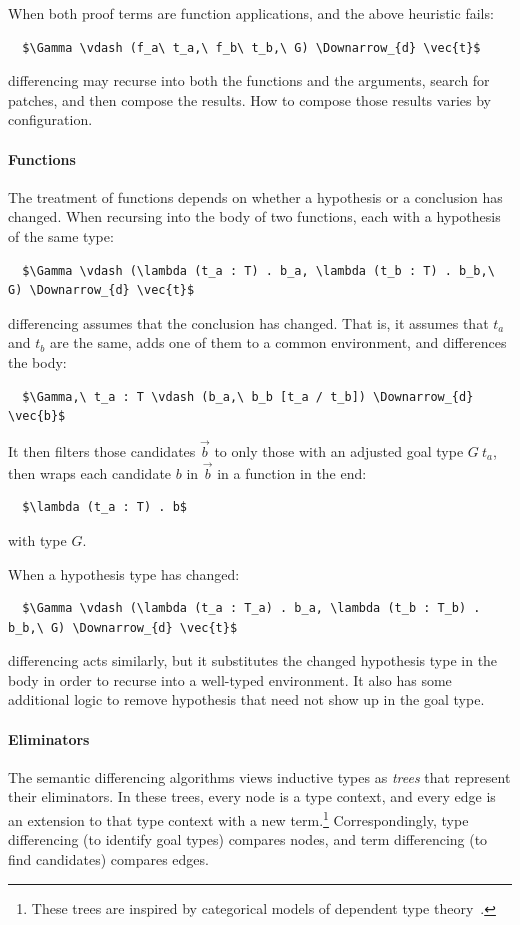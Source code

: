 When both proof terms are function applications, and the above heuristic fails:

\begin{lstlisting}
  $\Gamma \vdash (f_a\ t_a,\ f_b\ t_b,\ G) \Downarrow_{d} \vec{t}$
\end{lstlisting}
differencing may recurse into both the functions and the arguments, search for patches, and then compose the results.
How to compose those results varies by configuration.

\paragraph{Functions} %
The treatment of functions depends on whether a hypothesis or a conclusion has changed.
When recursing into the body of two functions, each with a hypothesis of the same type:

\begin{lstlisting}
  $\Gamma \vdash (\lambda (t_a : T) . b_a, \lambda (t_b : T) . b_b,\ G) \Downarrow_{d} \vec{t}$
\end{lstlisting}
differencing assumes that the conclusion has changed.
That is, it assumes that $t_a$ and $t_b$ are the same, adds one of them to a common environment,
and differences the body:

\begin{lstlisting}
  $\Gamma,\ t_a : T \vdash (b_a,\ b_b [t_a / t_b]) \Downarrow_{d} \vec{b}$
\end{lstlisting}
It then filters those candidates $\vec{b}$ to only those with an adjusted goal type $G\ t_a$,
then wraps each candidate $b$ in $\vec{b}$ in a function in the end:

\begin{lstlisting}
  $\lambda (t_a : T) . b$
\end{lstlisting}
with type $G$.

When a hypothesis type has changed:

\begin{lstlisting}
  $\Gamma \vdash (\lambda (t_a : T_a) . b_a, \lambda (t_b : T_b) . b_b,\ G) \Downarrow_{d} \vec{t}$
\end{lstlisting}
differencing acts similarly, but it substitutes the changed hypothesis type in the body in order to recurse into a well-typed environment.
It also has some additional logic to remove hypothesis that need not show up in the goal type.

\paragraph{Eliminators} %
The semantic differencing algorithms views inductive types as \emph{trees} that represent their eliminators.
In these trees, every node is a type context, and every edge is an extension to that type context 
with a new term.\footnote{These trees are inspired by categorical models of dependent type theory~\cite{Hofmann97}.}
Correspondingly, type differencing (to identify goal types) compares nodes, 
and term differencing (to find candidates) compares edges. 

